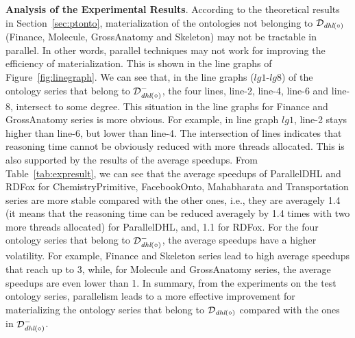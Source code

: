 \textbf{Analysis of the Experimental Results}.
According to the theoretical results in Section~\ref{sec:ptonto},
materialization of the
ontologies not belonging to $\mathcal{D}_{\textit{\text{dhl}}(\circ)}$
(Finance, Molecule, GrossAnatomy and Skeleton)
may not be tractable in parallel. In other words,
parallel techniques may not work for improving the efficiency of materialization.
This is shown in the line graphs of Figure~\ref{fig:linegraph}.
We can see that, in the line graphs ($lg1$-$lg8$) of the ontology series
that belong to $\mathcal{D}^-_{\textit{\text{dhl}}(\circ)}$, the four lines, line-2, line-4, line-6 and line-8,
intersect to some degree. This situation in the line graphs for Finance and GrossAnatomy
series is more obvious. For example, in line graph $lg1$,
line-2 stays higher than line-6, but lower than line-4.
The intersection of lines indicates that reasoning time cannot be obviously reduced with more threads allocated.
This is also supported by the results of the average speedups.
From Table~\ref{tab:expresult}, we can see that the average speedups of ParallelDHL and RDFox
for ChemistryPrimitive, FacebookOnto, Mahabharata and Transportation series
are more stable compared with the other ones, i.e., they are averagely 1.4
(it means that the reasoning time can be reduced averagely by 1.4 times with two more threads allocated)
for ParallelDHL, and, 1.1 for RDFox. For the four ontology series that belong to $\mathcal{D}^-_{\textit{\text{dhl}}(\circ)}$,
the average speedups have a higher volatility. For example,
Finance and Skeleton series lead to high average speedups that reach up to 3,
while, for Molecule and GrossAnatomy series, the average speedups are even lower than 1.
In summary, from the experiments on the test ontology series,
parallelism leads to a more effective improvement for materializing the ontology series
that belong to $\mathcal{D}_{\textit{\text{dhl}}(\circ)}$ compared with the ones in $\mathcal{D}^-_{\textit{\text{dhl}}(\circ)}$.

